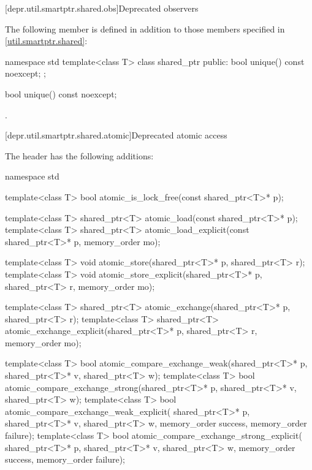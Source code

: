 [depr.util.smartptr.shared.obs]{Deprecated  observers}

\pnum
The following member is defined in addition to those members specified
in \ref{util.smartptr.shared}:

%
\begin{codeblock}
namespace std {
  template<class T> class shared_ptr {
  public:
    bool unique() const noexcept;
  };
}
\end{codeblock}

%
\begin{itemdecl}
bool unique() const noexcept;
\end{itemdecl}

\begin{itemdescr}
\pnum\returns {}.
\end{itemdescr}

[depr.util.smartptr.shared.atomic]{Deprecated  atomic access}

\pnum
The header  has the following additions:

%
\begin{codeblock}
namespace std {
  template<class T>
    bool atomic_is_lock_free(const shared_ptr<T>* p);

  template<class T>
    shared_ptr<T> atomic_load(const shared_ptr<T>* p);
  template<class T>
    shared_ptr<T> atomic_load_explicit(const shared_ptr<T>* p, memory_order mo);

  template<class T>
    void atomic_store(shared_ptr<T>* p, shared_ptr<T> r);
  template<class T>
    void atomic_store_explicit(shared_ptr<T>* p, shared_ptr<T> r, memory_order mo);

  template<class T>
    shared_ptr<T> atomic_exchange(shared_ptr<T>* p, shared_ptr<T> r);
  template<class T>
    shared_ptr<T> atomic_exchange_explicit(shared_ptr<T>* p, shared_ptr<T> r, memory_order mo);

  template<class T>
    bool atomic_compare_exchange_weak(shared_ptr<T>* p, shared_ptr<T>* v, shared_ptr<T> w);
  template<class T>
    bool atomic_compare_exchange_strong(shared_ptr<T>* p, shared_ptr<T>* v, shared_ptr<T> w);
  template<class T>
    bool atomic_compare_exchange_weak_explicit(
      shared_ptr<T>* p, shared_ptr<T>* v, shared_ptr<T> w,
      memory_order success, memory_order failure);
  template<class T>
    bool atomic_compare_exchange_strong_explicit(
      shared_ptr<T>* p, shared_ptr<T>* v, shared_ptr<T> w,
      memory_order success, memory_order failure);
}
\end{codeblock}


